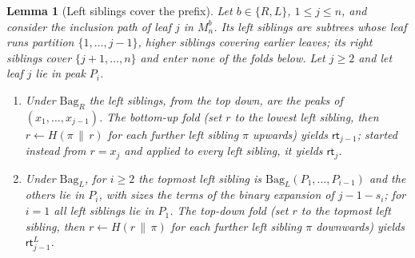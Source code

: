 \documentclass[11pt,a4paper]{article}
\newtheorem{lemma}[theorem]{Lemma}
\theoremstyle{definition}
\begin{document}
\begin{lemma}[Left siblings cover the prefix]\label{lem:left-siblings}
Let $b\in\{R,L\}$, $1\le j\le n$, and consider the inclusion path of leaf $j$
in $M^b_n$. Its left siblings are subtrees whose leaf runs partition
$\{1,\dots,j-1\}$, higher siblings covering earlier leaves; its right
siblings cover $\{j+1,\dots,n\}$ and enter none of the folds below. Let
$j\ge 2$ and let leaf $j$ lie in peak $P_i$.
\begin{enumerate}
\item Under $\mathrm{Bag}_R$ the left siblings, from the top down, are the
  peaks of $(x_1,\dots,x_{j-1})$. The \emph{bottom-up fold} (set $r$ to the
  lowest left sibling, then $r\leftarrow H(\pi\,\|\,r)$ for each further left
  sibling $\pi$ upwards) yields $\mathsf{rt}_{j-1}$; started instead from
  $r=x_j$ and applied to every left sibling, it yields $\mathsf{rt}_j$.
\item Under $\mathrm{Bag}_L$, for $i\ge 2$ the topmost left sibling is
  $\mathrm{Bag}_L(P_1,\dots,P_{i-1})$ and the others lie in $P_i$, with
  sizes the terms of the binary expansion of $j-1-s_i$; for $i=1$ all left
  siblings lie in $P_1$. The \emph{top-down fold} (set $r$ to the topmost
  left sibling, then $r\leftarrow H(r\,\|\,\pi)$ for each further left sibling
  $\pi$ downwards) yields $\mathsf{rt}^L_{j-1}$.
\end{enumerate}
\end{lemma}
\end{document}
